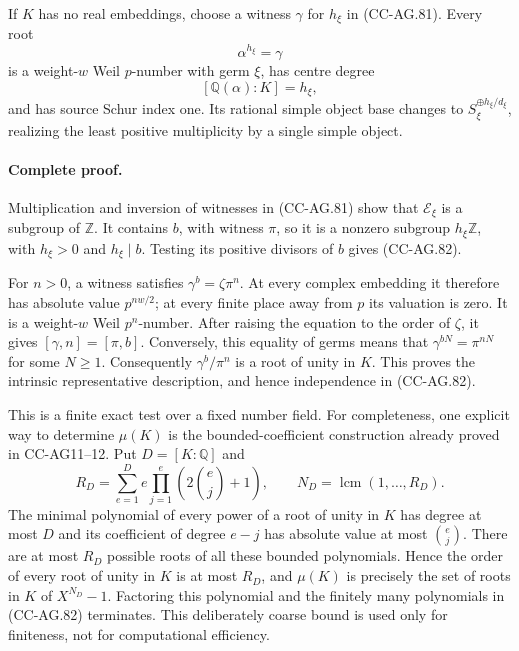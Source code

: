 If \(K\) has no real embeddings, choose a witness \(\gamma\)
for \(h_\xi\) in (CC-AG.81).  Every root
\[
                             \alpha^{h_\xi}=\gamma
                                                        \tag{CC-AG.86}
\]
is a weight-\(w\) Weil \(p\)-number with germ \(\xi\),
has centre degree
\[
                           [\mathbb Q(\alpha):K]=h_\xi,
                                                        \tag{CC-AG.87}
\]
and has source Schur index one.  Its rational simple object
base changes to \(S_\xi^{\oplus h_\xi/d_\xi}\), realizing the
least positive multiplicity by a single simple object.

\paragraph{Complete proof.}
Multiplication and inversion of witnesses in (CC-AG.81) show
that \(\mathscr E_\xi\) is a subgroup of \(\mathbb Z\).
It contains \(b\), with witness \(\pi\), so it is a nonzero
subgroup \(h_\xi\mathbb Z\), with \(h_\xi>0\) and \(h_\xi\mid b\).
Testing its positive divisors of \(b\) gives (CC-AG.82).

For \(n>0\), a witness satisfies
\(\gamma^b=\zeta\pi^n\).  At every complex embedding it
therefore has absolute value \(p^{nw/2}\); at every finite
place away from \(p\) its valuation is zero.  It is a
weight-\(w\) Weil \(p^n\)-number.  After raising the equation
to the order of \(\zeta\), it gives
\([\gamma,n]=[\pi,b]\).  Conversely, this equality of germs
means that \(\gamma^{bN}=\pi^{nN}\) for some \(N\ge1\).
Consequently \(\gamma^b/\pi^n\) is a root of unity in \(K\).
This proves the intrinsic representative description, and
hence independence in (CC-AG.82).

This is a finite exact test over a fixed number field.
For completeness, one explicit way to determine \(\mu(K)\)
is the bounded-coefficient construction already proved
in CC-AG11--12.  Put \(D=[K:\mathbb Q]\) and
\[
 R_D=\sum_{e=1}^{D}e\prod_{j=1}^{e}
                  \left(2\binom ej+1\right),\qquad
 N_D=\operatorname{lcm}(1,\ldots,R_D).
\]
The minimal polynomial of every power of a root of unity
in \(K\) has degree at most \(D\) and its coefficient of
degree \(e-j\) has absolute value at most \(\binom ej\).
There are at most \(R_D\) possible roots of all these
bounded polynomials.  Hence the order of every root of
unity in \(K\) is at most \(R_D\), and \(\mu(K)\) is precisely
the set of roots in \(K\) of \(X^{N_D}-1\).  Factoring this
polynomial and the finitely many polynomials in
(CC-AG.82) terminates.  This deliberately coarse bound is
used only for finiteness, not for computational efficiency.

